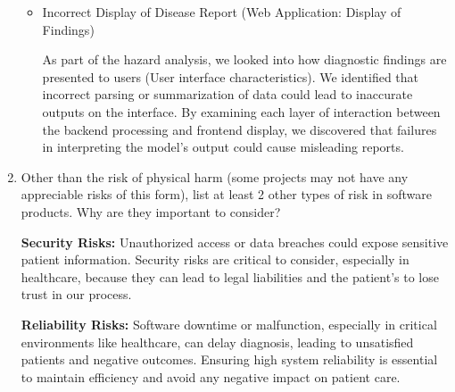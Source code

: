 \documentclass{article}
\begin{document}
\begin{enumerate}
\begin{itemize}
      \item Incorrect Display of Disease Report (Web Application: Display of Findings)

        As part of the hazard analysis, we looked into how diagnostic findings are presented to
        users (User interface characteristics). We identified that incorrect parsing or
        summarization of data could lead to inaccurate outputs on the interface. By examining each
        layer of interaction between the backend processing and frontend display, we discovered 
        that failures in interpreting the model's output could cause misleading reports.
    \end{itemize}

  \item Other than the risk of physical harm (some projects may not have any
    appreciable risks of this form), list at least 2 other types of risk in
    software products. Why are they important to consider?

    \textbf{Security Risks:} Unauthorized access or data breaches could expose sensitive patient
    information. Security risks are critical to consider, especially in healthcare, because they
    can lead to legal liabilities and the patient’s to lose trust in our process.

    \textbf{Reliability Risks:} Software downtime or malfunction, especially in critical
    environments like healthcare, can delay diagnosis, leading to unsatisfied patients and
    negative outcomes. Ensuring high system reliability is essential to maintain efficiency and
    avoid any negative impact on patient care.
\end{enumerate}
\end{document}
